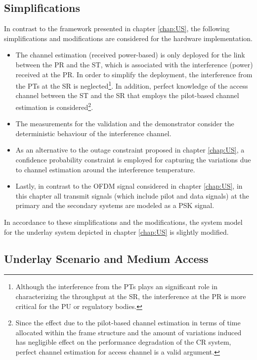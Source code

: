 \subsection{Simplifications}
\label{ssec:simp1}
In contrast to the framework presented in chapter \ref{chap:US}, the following simplifications and modifications are considered for the hardware implementation.
\begin{itemize}
\item The channel estimation (received power-based) is only deployed for the link between the PR and the ST, which is associated with the interference (power) received at the PR. In order to simplify the deployment, the interference from the PTs at the SR is neglected\footnote{Although the interference from the PTs plays an significant role in characterizing the throughput at the SR, the interference at the PR is more critical for the PU or regulatory bodies.}. In addition, perfect knowledge of the access channel between the ST and the SR that employs the pilot-based channel estimation is considered\footnote{Since the effect due to the pilot-based channel estimation in terms of time allocated within the frame structure and the amount of variations induced has negligible effect on the performance degradation of the CR system, perfect channel estimation for access channel is a valid argument.}.  
\item The measurements for the validation and the demonstrator consider the deterministic behaviour of the interference channel.  
\item As an alternative to the outage constraint proposed in chapter \ref{chap:US}, a confidence probability constraint is employed for capturing the variations due to channel estimation around the interference temperature. %
\item Lastly, in contrast to the OFDM signal considered in chapter \ref{chap:US}, in this chapter all transmit signals (which include pilot and data signals) at the primary and the secondary systems are modeled as a PSK signal. 
\end{itemize}

In accordance to these simplifications and the modifications, the system model for the underlay system depicted in chapter \ref{chap:US} is slightly modified. 

\subsection{Underlay Scenario and Medium Access}
\label{scenario}

